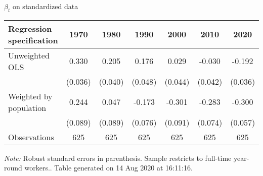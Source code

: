 \begin{center}
\begin{threeparttable}[!h]
\caption{$\beta_t$ on standardized data}
\label{tab:elast}
\begin{tabular}{lcccccc}
\toprule
\toprule
\textbf{Regression specification}&\multicolumn{1}{c}{\textbf{1970}}&\multicolumn{1}{c}{\textbf{1980}}&\multicolumn{1}{c}{\textbf{1990}}&\multicolumn{1}{c}{\textbf{2000}}&\multicolumn{1}{c}{\textbf{2010}}&\multicolumn{1}{c}{\textbf{2020}} \\
\midrule
Unweighted OLS      &       0.330\sym{***}&       0.205\sym{***}&       0.176\sym{***}&       0.029         &      -0.030         &      -0.192\sym{***}\\
                    &     (0.036)         &     (0.040)         &     (0.048)         &     (0.044)         &     (0.042)         &     (0.036)         \\
Weighted by population&       0.244\sym{**} &       0.047         &      -0.173\sym{*}  &      -0.301\sym{**} &      -0.283\sym{***}&      -0.300\sym{***}\\
                    &     (0.089)         &     (0.089)         &     (0.076)         &     (0.091)         &     (0.074)         &     (0.057)         \\
\midrule Observations&         625         &         625         &         625         &         625         &         625         &         625         \\
\bottomrule
\bottomrule
\end{tabular}
\begin{tablenotes}
\item \footnotesize \textit{Note:} Robust standard errors in parenthesis. Sample restricts to full-time year-round workers.. Table generated on 14 Aug 2020 at 16:11:16.
\end{tablenotes}
\end{threeparttable}
\end{center}
